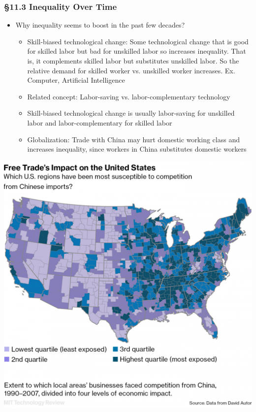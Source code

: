 \documentclass[12pt, xcolor=dvipsnames]{beamer}
\begin{document}
\begin{frame}
\frametitle{\bf §11.3 Inequality Over Time}
\begin{itemize}
\item Why inequality seems to boost in the past few decades?
\begin{itemize}
\item Skill-biased technological change: Some technological change that is good for skilled labor but bad for unskilled labor so increases inequality. That is, it complements skilled labor but substitutes unskilled labor. So the relative demand for skilled worker vs. unskilled worker increases. Ex. Computer, Artificial Intelligence
\item Related concept: Labor-saving vs. labor-complementary technology
\item Skill-biased technological change is usually labor-saving for unskilled labor and labor-complementary for skilled labor
\item Globalization: Trade with China may hurt domestic working class and increases inequality, since workers in China substitutes domestic workers
\end{itemize}
\end{itemize}
\end{frame}



\begin{frame}
\begin{center}
\includegraphics[height=\textheight]{figures/autor.png}
\end{center}
\end{frame}
\end{document}
